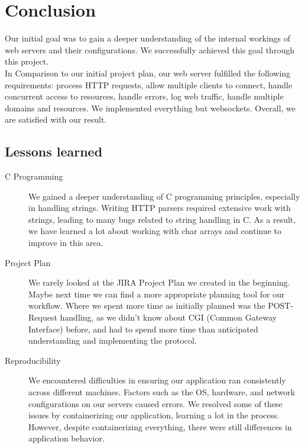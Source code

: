 \section*{Conclusion}
Our initial goal was to gain a deeper understanding of the internal workings of web servers and their configurations. We successfully achieved this goal through this project. \\
In Comparison to our initial project plan, our web server fulfilled the following requirements: process HTTP requests, allow multiple clients to connect, handle concurrent access to resources, handle errors, log web traffic, handle multiple domains and resources. We implemented everything but websockets. Overall, we are satisfied with our result.


\subsection*{Lessons learned}
\begin{description}
    \item[C Programming] We gained a deeper understanding of C programming principles, especially in handling strings. Writing HTTP parsers required extensive work with strings, leading to many bugs related to string handling in C. As a result, we have learned a lot about working with char arrays and continue to improve in this area.
    \item[Project Plan]We rarely looked at the JIRA Project Plan we created in the beginning. Maybe next time we can find a more appropriate planning tool for our workflow.
    Where we spent more time as initially planned was the POST-Request handling, as we didn't know about CGI (Common Gateway Interface) before, and had to spend more time than anticipated understanding and implementing the protocol. 
    \item[Reproducibility]We encountered difficulties in ensuring our application ran consistently across different machines. Factors such as the OS, hardware, and network configurations on our servers caused errors. We resolved some of these issues by containerizing our application, learning a lot in the process. However, despite containerizing everything, there were still differences in application behavior.
\end{description}


